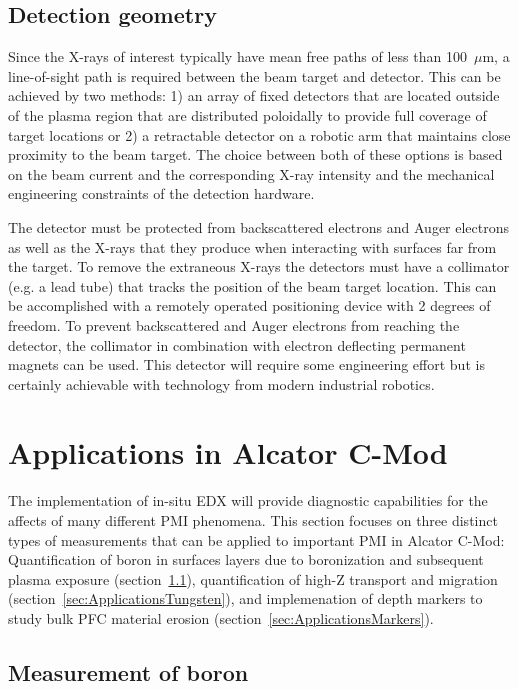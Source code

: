 \documentclass[12pt,letterpaper,final]{article}
\begin{document}
\subsection{Detection geometry}
\label{sec:DetectionGeometry}

Since the X-rays of interest typically have mean free paths of less than 100~$\mu$m, a line-of-sight path is required between the beam target and detector. This can be achieved by two methods: 1) an array of fixed detectors that are located outside of the plasma region that are distributed poloidally to provide full coverage of target locations or 2) a retractable detector on a robotic arm that maintains close proximity to the beam target. The choice between both of these options is based on the beam current and the corresponding X-ray intensity and the mechanical engineering constraints of the detection hardware. 

The detector must be protected from backscattered electrons and Auger electrons as well as the X-rays that they produce when interacting with surfaces far from the target.  To remove the extraneous X-rays the detectors must have a collimator (e.g. a lead tube) that tracks the position of the beam target location. This can be accomplished with a remotely operated positioning device with 2 degrees of freedom. To prevent backscattered and Auger electrons from reaching the detector, the collimator in combination with electron deflecting permanent magnets can be used. This detector will require some engineering effort but is certainly achievable with technology from modern industrial robotics.

\section{Applications in Alcator C-Mod}

The implementation of in-situ EDX will provide diagnostic capabilities for the affects of many different PMI phenomena. This section focuses on three distinct types of measurements that can be applied to important PMI in Alcator C-Mod: Quantification of boron in surfaces layers due to boronization and subsequent plasma exposure (section~\ref{sec:ApplicationsBoron}), quantification of high-Z transport and migration (section~\ref{sec:ApplicationsTungsten}), and implemenation of depth markers to study bulk PFC material erosion (section~\ref{sec:ApplicationsMarkers}).
\subsection{Measurement of boron}
\label{sec:ApplicationsBoron}
\end{document}
